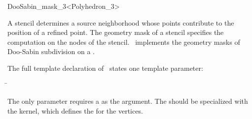 \ccRefPageEnd


\begin{ccRefClass}{DooSabin_mask_3<Polyhedron_3>}

\ccDefinition

A stencil determines a source neighborhood 
whose points contribute to the position of a refined point.
The geometry mask of a stencil specifies
the computation on the nodes of the stencil.
\ccClassTemplateName\ implements the geometry masks of 
Doo-Sabin subdivision on a .


\ccParameters

The full template declaration of \ccClassTemplateName\ states one
template parameter:

\begin{tabbing}
 \= 
\end{tabbing}
   
The only parameter requires a  as the argument. The
 should be specialized with the 
kernel, which defines the  for the vertices.

\ccCreation
{}


\ccThreeToTwo


\ccSeeAlso

\\

\end{ccRefClass}

